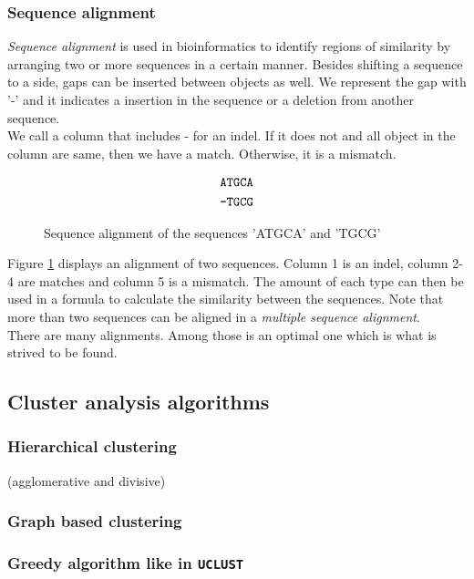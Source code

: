 \documentclass[11pt,a4paper]{article}
\begin{document}
\subsubsection{Sequence alignment}
\emph{Sequence alignment} is used in bioinformatics to identify regions of
similarity by arranging two or more sequences in a certain manner. Besides
shifting a sequence to a side, gaps can be inserted between objects as well. We
represent the gap with '-' and it indicates a insertion in the sequence or a
deletion from another sequence.\\
We call a column that includes - for an indel. If it does not and all object in
the column are same, then we have a match. Otherwise, it is a mismatch.\\
\begin{figure}[h!]
  \centering
  	  \begin{align*}
  	  	\mbox{\texttt{ATGCA}} \\
      	\mbox{\texttt{-TGCG}}
  	  \end{align*}
  \caption{Sequence alignment of the sequences 'ATGCA' and 'TGCG'}
  \label{fig:seqAlignment}
\end{figure}
Figure \ref{fig:seqAlignment} displays an alignment of two sequences. Column 1
is an indel, column 2-4 are matches and column 5 is a mismatch. The amount of
each type can then be used in a formula to calculate the similarity between the
sequences. Note that more than two sequences can be aligned in a \emph{multiple
sequence alignment}. \\
There are many alignments. Among those is an optimal one which is what is
strived to be found.

\subsection{Cluster analysis algorithms}

\subsubsection{Hierarchical clustering}
(agglomerative and divisive)

\subsubsection{Graph based clustering}


\subsubsection{Greedy algorithm like in \texttt{UCLUST}} 
\end{document}
